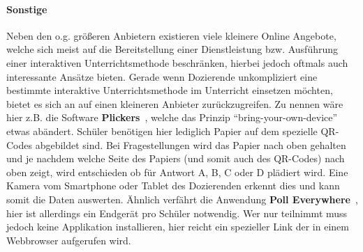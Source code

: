\paragraph{Sonstige}
Neben den o.g. größeren Anbietern existieren viele kleinere Online Angebote, welche sich meist auf die Bereitstellung einer Dienstleistung bzw. Ausführung einer interaktiven Unterrichtsmethode beschränken, hierbei jedoch oftmals auch interessante Ansätze bieten. Gerade wenn Dozierende unkompliziert eine bestimmte interaktive Unterrichtsmethode im Unterricht einsetzen möchten, bietet es sich an auf einen kleineren Anbieter zurückzugreifen. Zu nennen wäre hier z.B. die Software \textbf{Plickers}~\cite{PlickersInc2019}, welche das Prinzip "`bring-your-own-device"' etwas abändert. Schüler benötigen hier lediglich Papier auf dem spezielle QR-Codes abgebildet sind. Bei Fragestellungen wird das Papier nach oben gehalten und je nachdem welche Seite des Papiers (und somit auch des QR-Codes) nach oben zeigt, wird entschieden ob für Antwort A, B, C oder D plädiert wird. Eine Kamera vom Smartphone oder Tablet des Dozierenden erkennt dies und kann somit die Daten auswerten. Ähnlich verfährt die Anwendung \textbf{Poll Everywhere}~\cite{PEI2018}, hier ist allerdings ein Endgerät pro Schüler notwendig. Wer nur teilnimmt muss jedoch keine Applikation installieren, hier reicht ein spezieller Link der in einem Webbrowser aufgerufen wird.  
